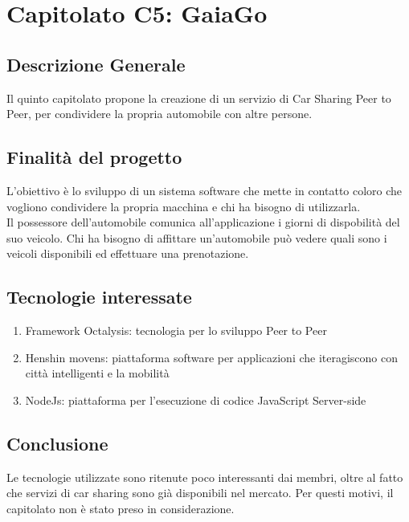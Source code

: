 \chapter{Capitolato C5: GaiaGo}
\section{Descrizione Generale}

Il quinto capitolato propone la creazione di un servizio di Car Sharing Peer to Peer, per condividere la propria automobile con altre persone.\\


\section{Finalit\`a del progetto}
L'obiettivo è lo sviluppo di un sistema software che mette in contatto coloro che vogliono condividere la propria macchina e chi ha bisogno di utilizzarla.\\
Il possessore dell'automobile comunica all'applicazione i giorni di dispobilit\`a del suo veicolo.
Chi ha bisogno di affittare un'automobile può vedere quali sono i veicoli disponibili ed effettuare una prenotazione.

\section{Tecnologie interessate}
\begin{enumerate}
\item Framework Octalysis: tecnologia per lo sviluppo Peer to Peer
\item Henshin movens: piattaforma software per applicazioni che iteragiscono con città intelligenti e la mobilità
\item NodeJs: piattaforma per l'esecuzione di codice JavaScript Server-side
\end{enumerate}
\section{Conclusione}
Le tecnologie utilizzate sono ritenute poco interessanti dai membri, oltre al fatto che servizi di car sharing sono già disponibili nel mercato. Per questi motivi, il capitolato non è stato preso in considerazione. 